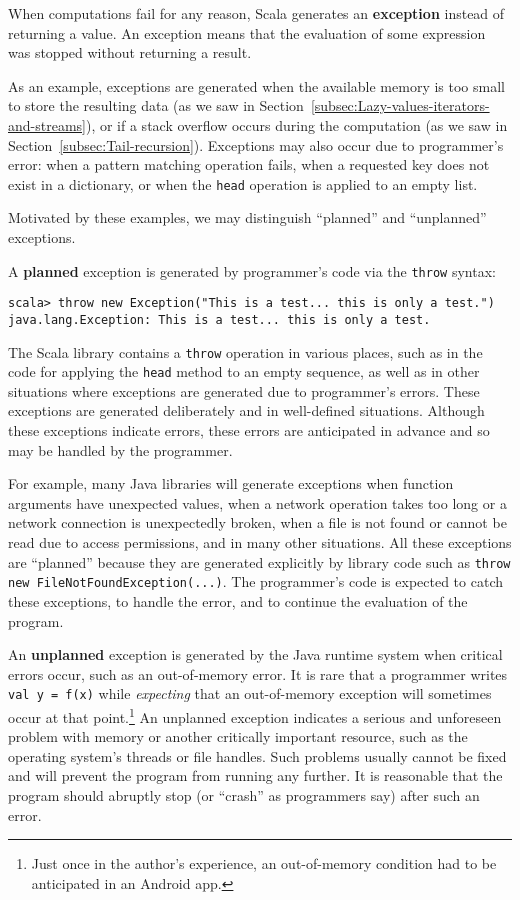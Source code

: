 When computations fail for any reason, Scala generates an \textbf{exception}
instead of returning a value. An exception means that the evaluation
of some expression was stopped without returning a result.

As an example, exceptions are generated when the available memory
is too small to store the resulting data (as we saw in Section~\ref{subsec:Lazy-values-iterators-and-streams}),
or if a stack overflow occurs during the computation (as we saw in
Section~\ref{subsec:Tail-recursion}). Exceptions may also occur
due to programmer's error: when a pattern matching operation fails,
when a requested key does not exist in a dictionary, or when the \lstinline!head!
operation is applied to an empty list.

Motivated by these examples, we may distinguish ``planned''
and ``unplanned'' exceptions. 

A \textbf{planned} exception is generated by programmer's code via
the \lstinline!throw! syntax:
\begin{lstlisting}
scala> throw new Exception("This is a test... this is only a test.")
java.lang.Exception: This is a test... this is only a test.
\end{lstlisting}
The Scala library contains a \lstinline!throw! operation in various
places, such as in the code for applying the \lstinline!head! method
to an empty sequence, as well as in other situations where exceptions
are generated due to programmer's errors. These exceptions are generated
deliberately and in well-defined situations. Although these exceptions
indicate errors, these errors are anticipated in advance and so may
be handled by the programmer.

For example, many Java libraries will generate exceptions when function
arguments have unexpected values, when a network operation takes too
long or a network connection is unexpectedly broken, when a file is
not found or cannot be read due to access permissions, and in many
other situations. All these exceptions are ``planned'' because they
are generated explicitly by library code such as \lstinline!throw new FileNotFoundException(...)!.
The programmer's code is expected to catch these exceptions, to handle
the error, and to continue the evaluation of the program.

An \textbf{unplanned} exception is generated
by the Java runtime system when critical errors occur, such as an
out-of-memory error. It is rare that a programmer writes \lstinline!val y = f(x)!
while \emph{expecting} that an out-of-memory exception will sometimes
occur at that point.\footnote{Just once in the author's experience, an out-of-memory condition had
to be anticipated in an Android app.} An unplanned exception indicates a serious and unforeseen problem
with memory or another critically important resource, such as the
operating system's threads or file handles. Such problems usually
cannot be fixed and will prevent the program from running any further.
It is reasonable that the program should abruptly stop (or ``crash''
as programmers say) after such an error.

